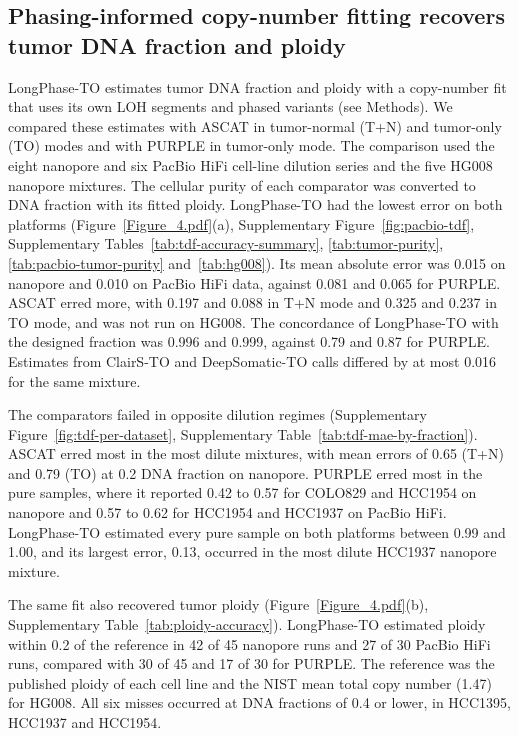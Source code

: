 \documentclass[unnumsec,webpdf,contemporary,large]{oup-authoring-template}
\begin{document}
\subsection{Phasing-informed copy-number fitting recovers tumor DNA fraction and ploidy}
LongPhase-TO estimates tumor DNA fraction and ploidy with a copy-number fit that uses its own LOH segments and phased variants (see Methods). We compared these estimates with ASCAT in tumor-normal (T+N) and tumor-only (TO) modes and with PURPLE in tumor-only mode. The comparison used the eight nanopore and six PacBio HiFi cell-line dilution series and the five HG008 nanopore mixtures. The cellular purity of each comparator was converted to DNA fraction with its fitted ploidy. LongPhase-TO had the lowest error on both platforms (Figure~\ref{Figure_4.pdf}(a), Supplementary Figure~\ref{fig:pacbio-tdf}, Supplementary Tables~\ref{tab:tdf-accuracy-summary}, \ref{tab:tumor-purity}, \ref{tab:pacbio-tumor-purity} and~\ref{tab:hg008}). Its mean absolute error was 0.015 on nanopore and 0.010 on PacBio HiFi data, against 0.081 and 0.065 for PURPLE. ASCAT erred more, with 0.197 and 0.088 in T+N mode and 0.325 and 0.237 in TO mode, and was not run on HG008. The concordance of LongPhase-TO with the designed fraction was 0.996 and 0.999, against 0.79 and 0.87 for PURPLE. Estimates from ClairS-TO and DeepSomatic-TO calls differed by at most 0.016 for the same mixture.

The comparators failed in opposite dilution regimes (Supplementary Figure~\ref{fig:tdf-per-dataset}, Supplementary Table~\ref{tab:tdf-mae-by-fraction}). ASCAT erred most in the most dilute mixtures, with mean errors of 0.65 (T+N) and 0.79 (TO) at 0.2 DNA fraction on nanopore. PURPLE erred most in the pure samples, where it reported 0.42 to 0.57 for COLO829 and HCC1954 on nanopore and 0.57 to 0.62 for HCC1954 and HCC1937 on PacBio HiFi. LongPhase-TO estimated every pure sample on both platforms between 0.99 and 1.00, and its largest error, 0.13, occurred in the most dilute HCC1937 nanopore mixture.

The same fit also recovered tumor ploidy (Figure~\ref{Figure_4.pdf}(b), Supplementary Table~\ref{tab:ploidy-accuracy}). LongPhase-TO estimated ploidy within 0.2 of the reference in 42 of 45 nanopore runs and 27 of 30 PacBio HiFi runs, compared with 30 of 45 and 17 of 30 for PURPLE. The reference was the published ploidy of each cell line and the NIST mean total copy number (1.47) for HG008. All six misses occurred at DNA fractions of 0.4 or lower, in HCC1395, HCC1937 and HCC1954.
\end{document}

